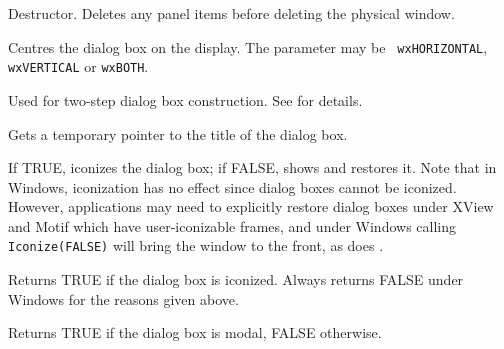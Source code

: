 Destructor.  Deletes any panel items before deleting the physical window.



Centres the dialog box on the display. The parameter may be {\tt
wxHORIZONTAL}, {\tt wxVERTICAL} or {\tt wxBOTH}.



Used for two-step dialog box construction. See \rtfsp
for details.



Gets a temporary pointer to the title of the dialog box.



If TRUE, iconizes the dialog box; if FALSE, shows and restores it. Note
that in Windows, iconization has no effect since dialog boxes cannot be
iconized. However, applications may need to explicitly restore dialog
boxes under XView and Motif which have user-iconizable frames, and under Windows
calling {\tt Iconize(FALSE)} will bring the window to the front, as does
.



Returns TRUE if the dialog box is iconized. Always returns FALSE under
Windows for the reasons given above.



Returns TRUE if the dialog box is modal, FALSE otherwise.

\label{wxdialogboxoncharhook}


